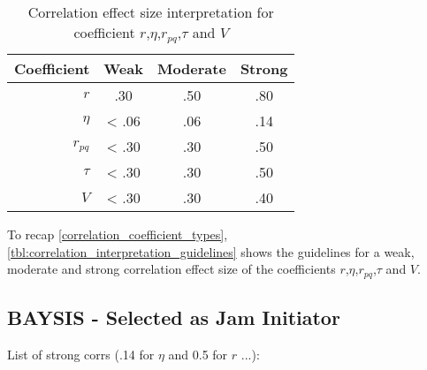 \begin{table}[ht]
	\centering
	\begin{tabular}{r|c|c|c}  
		\toprule
		Coefficient & Weak 	& Moderate 	& Strong \\
		\midrule
		$r$ 		& .30	& .50		& .80 \\
		$\eta$ 		& < .06 & .06		& .14 \\
		$r_{pq}$	& < .30	& .30		& .50 \\
		$\tau$ 		& < .30	& .30		& .50 \\
		$V$ 		& < .30	& .30		& .40 \\
		\bottomrule
	\end{tabular}
	\caption{Correlation effect size interpretation for coefficient $r$,$\eta$,$r_{pq}$,$\tau$ and $V$}
	\label{tbl:correlation_interpretation_guidelines}
\end{table}

To recap \autoref{correlation_coefficient_types}, \autoref{tbl:correlation_interpretation_guidelines} shows the guidelines for a weak, moderate and strong correlation effect size of the coefficients $r$,$\eta$,$r_{pq}$,$\tau$ and $V$.



%
%

%

\subsection{BAYSIS - Selected as Jam Initiator}

List of strong corrs (.14 for $\eta$ and 0.5 for $r$ ...):

